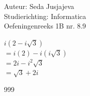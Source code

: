 \documentclass[a4paper]{article}
\begin{document}
\noindent \large Auteur: Seda Jusjajeva\\
\noindent \large Studierichting: Informatica\\
\noindent \large Oefeningenreeks 1B nr. 8.9\\

\medskip

\normalsize

$i(2 - i\sqrt{3})$ \\

$= i(2) - i (i\sqrt{3})$ \\

$= 2i - i^2\sqrt{3}$ \\

$= \sqrt{3} + 2i$ \\



\begin{thebibliography}{999}
\end{thebibliography}
\end{document}
